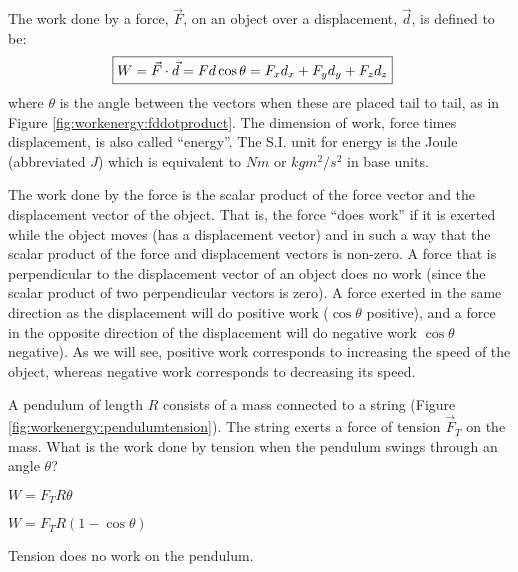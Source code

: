 The work done by a force, $\vec F$, on an object over a displacement, $\vec d$, is defined to be:
\begin{align}
\Aboxed{W = \vec F \cdot \vec d = Fd\cos\theta = F_xd_x+F_yd_y+F_zd_z}
\end{align}
where $\theta$ is the angle between the vectors when these are placed tail to tail, as in Figure \ref{fig:workenergy:fddotproduct}. The dimension of work, force times displacement, is also called ``energy''. The S.I. unit for energy is the Joule (abbreviated $\si{J}$) which is equivalent to $\si{Nm}$ or $\si{kg m^2/s^2}$ in base units.

The work done by the force is the scalar product of the force vector and the displacement vector of the object. That is, the force ``does work'' if it is exerted while the object moves (has a displacement vector) and in such a way that the scalar product of the force and displacement vectors is non-zero. A force that is perpendicular to the displacement vector of an object does no work (since the scalar product of two perpendicular vectors is zero).  A force exerted in the same direction as the displacement will do positive work ($\cos\theta$ positive), and a force in the opposite direction of the displacement will do negative work $\cos\theta$ negative). As we will see, positive work corresponds to increasing the speed of the object, whereas negative work corresponds to decreasing its speed.

\begin{checkpoint}

\begin{MCquestion}
{A pendulum of length $R$ consists of a mass connected to a string (Figure \ref{fig:workenergy:pendulumtension}). The string exerts a force of tension $\vec F_T$ on the mass. What is the work done by tension when the pendulum swings through an angle $\theta$?
} 
\item $W=F_TR\theta$
\item $W=F_TR(1-\cos\theta)$
\item Tension does no work on the pendulum. 
\end{MCquestion}
\end{checkpoint}

